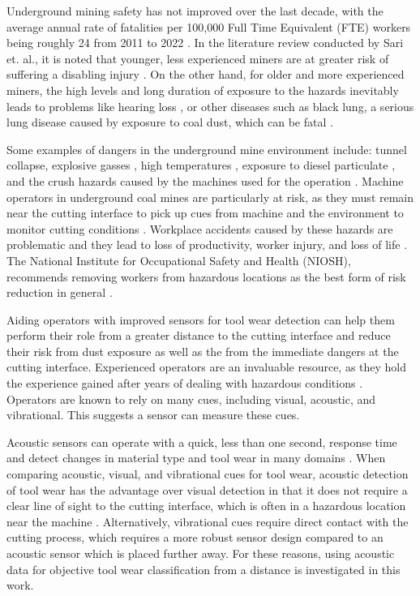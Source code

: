 Underground mining safety has not improved over the last decade, with the average annual rate of fatalities
per 100,000 Full Time Equivalent (FTE) workers being roughly 24 from 2011 to 2022 \cite{nioshdata}. 
In the literature review conducted by Sari et. al., it is noted that younger, less experienced
miners are at greater risk of suffering a disabling injury \cite{Sari2004}.
On the other hand, for older and more experienced miners, 
the high levels and long duration of exposure to the hazards inevitably leads to problems
like hearing loss \cite{Erol2022}, or other diseases such as black lung, 
a serious lung disease caused by exposure to coal dust, which can be fatal \cite{Colinent2020}.

Some examples of dangers in the underground mine environment include: 
tunnel collapse, explosive gasses \cite{Juganda2022},
high temperatures \cite{cinar2020}, exposure to diesel particulate \cite{Bugarski2022},
and the crush hazards caused by the machines used for the operation \cite{Swanson2019}.
Machine operators in underground coal mines are particularly at risk,
as they must remain near the cutting interface to pick up cues from machine and the environment
to monitor cutting conditions \cite{Bartels2009}.
Workplace accidents caused by these hazards are problematic and they lead to 
loss of productivity, worker injury, and loss of life \cite{sensogut2021}.
The National Institute for Occupational Safety and Health (NIOSH), 
recommends removing workers from hazardous locations as the best form
of risk reduction in general \cite{niosh_2015}.

Aiding operators with improved sensors for tool wear detection can help them 
perform their role from a greater distance to the cutting interface and 
reduce their risk from dust exposure as well as the from the immediate dangers at the cutting interface.
Experienced operators are an invaluable resource, 
 as they hold the experience gained after years of dealing with hazardous conditions \cite{Bartels2009}.
Operators are known to rely on many cues, including visual, acoustic, and vibrational.
This suggests a sensor can measure these cues.

Acoustic sensors can operate with a quick, less than one second, response time and detect changes in 
material type and tool wear in many domains \cite{Zakeri2017, Zhong2013, Rad2014, Zakeri2015}.
When comparing acoustic, visual, and vibrational cues for tool wear,
acoustic detection of tool wear has the advantage over visual detection in that it
does not require a clear line of sight to the cutting interface, 
which is often in a hazardous location near the machine \cite{Bartels2009}.
Alternatively, vibrational cues require direct contact with the cutting process, 
which requires a more robust sensor design compared to an acoustic sensor which is placed further away.
For these reasons, using acoustic data for objective tool wear classification from a distance is investigated in this work.

